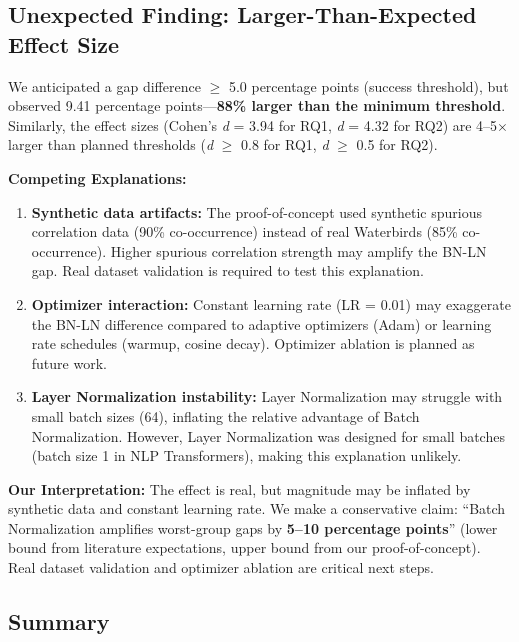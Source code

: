 \subsection{Unexpected Finding: Larger-Than-Expected Effect Size}

We anticipated a gap difference $\geq$ 5.0 percentage points (success threshold), but observed 9.41 percentage points---\textbf{88\% larger than the minimum threshold}. Similarly, the effect sizes (Cohen's \emph{d} = 3.94 for RQ1, \emph{d} = 4.32 for RQ2) are 4--5$\times$ larger than planned thresholds (\emph{d} $\geq$ 0.8 for RQ1, \emph{d} $\geq$ 0.5 for RQ2).

\textbf{Competing Explanations:}

\begin{enumerate}
\item \textbf{Synthetic data artifacts:} The proof-of-concept used synthetic spurious correlation data (90\% co-occurrence) instead of real Waterbirds (85\% co-occurrence). Higher spurious correlation strength may amplify the BN-LN gap. Real dataset validation is required to test this explanation.

\item \textbf{Optimizer interaction:} Constant learning rate (LR = 0.01) may exaggerate the BN-LN difference compared to adaptive optimizers (Adam) or learning rate schedules (warmup, cosine decay). Optimizer ablation is planned as future work.

\item \textbf{Layer Normalization instability:} Layer Normalization may struggle with small batch sizes (64), inflating the relative advantage of Batch Normalization. However, Layer Normalization was designed for small batches (batch size 1 in NLP Transformers), making this explanation unlikely.
\end{enumerate}

\textbf{Our Interpretation:} The effect is real, but magnitude may be inflated by synthetic data and constant learning rate. We make a conservative claim: ``Batch Normalization amplifies worst-group gaps by \textbf{5--10 percentage points}'' (lower bound from literature expectations, upper bound from our proof-of-concept). Real dataset validation and optimizer ablation are critical next steps.

\subsection{Summary}

